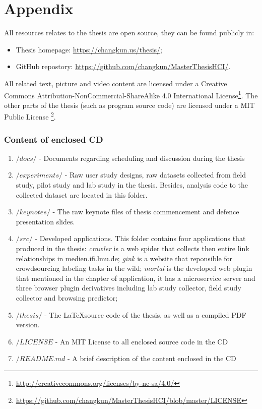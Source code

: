 \part*{Appendix}
\appendix
{}
\fancyhead[LE,RO,LO,RE]{} %

All resources relates to the thesis are open source, 
they can be found publicly in:

\begin{itemize}
    \item Thesis homepage: \url{https://changkun.us/thesis/};
    \item GitHub repostory: \url{https://github.com/changkun/MasterThesisHCI/}.
\end{itemize}

All related text, picture and video content are licensed under a 
Creative Commons Attribution-NonCommercial-ShareAlike 4.0 International 
License\footnote{\url{http://creativecommons.org/licenses/by-nc-sa/4.0/}}.
The other parts of the thesis (such as program source code) are licensed 
under a MIT Public License
\footnote{\url{https://github.com/changkun/MasterThesisHCI/blob/master/LICENSE}}.

\section{Content of enclosed CD}
\label{appendix:a}

\begin{enumerate}
    \item $/docs/$ - Documents regarding scheduling and discussion during the thesis
    \item $/experiments/$ - Raw user study designs, raw datasets collected from field study, pilot study and lab study in the thesis. Besides, analysis code to the collected dataset are located in this folder.
    \item $/keynotes/$ - The raw keynote files of thesis commencement and 
                        defence presentation slides.
    \item $/src/$ - Developed applications. This folder contains four applications that produced in the thesis: \emph{crawler} is a web spider that collects then entire link
    relationships in medien.ifi.lmu.de; \emph{gink} is a website that reponsible for 
    crowdsourcing labeling tasks in the wild; \emph{mortal} is the developed web plugin 
    that mentioned in the chapter of application, it has a microservice server and three browser plugin derivatives including lab study collector, field study collector and browsing predictor;
    \item $/thesis/$ - The \LaTeX source code of the thesis, as well as a compiled PDF version.
    \item $/LICENSE$ - An MIT License to all enclosed source code in the CD
    \item $/README.md$ - A brief description of the content enclosed in the CD
\end{enumerate}

